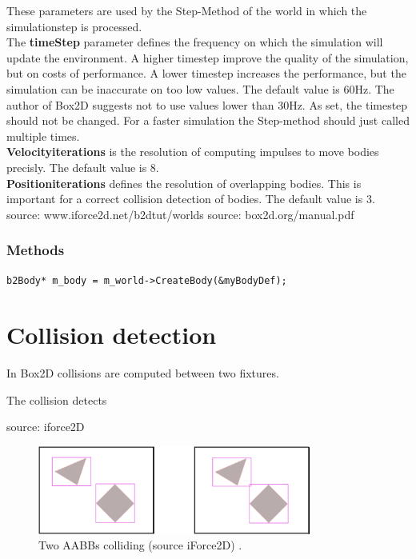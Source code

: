 \documentclass[10pt,a4paper,DIV=11]{scrreprt}
\begin{document}
These parameters are used by the Step-Method of the world in which the simulationstep is processed. \\

The \textbf{timeStep} parameter defines the frequency on which the simulation will update the environment. A higher timestep improve the quality of the simulation, but on costs of performance. A lower timestep increases the performance, but the simulation can be inaccurate on too low values.
The default value is 60Hz. The author of Box2D suggests not to use values lower than 30Hz. As set, the timestep should not be changed. For a faster simulation the Step-method should just called multiple times. \\


\textbf{Velocityiterations} is the resolution of computing impulses to move bodies precisly. The default value is 8. \\

\textbf{Positioniterations} defines the resolution of overlapping bodies. This is important for a correct collision detection of bodies. The default value is 3. \\


source: www.iforce2d.net/b2dtut/worlds
source: box2d.org/manual.pdf

\subsubsection*{Methods}
\begin{lstlisting}[caption={World creates a body},label=lst:world-body]
b2Body* m_body = m_world->CreateBody(&myBodyDef);
\end{lstlisting}

\section{Collision detection}
In Box2D collisions are computed between two fixtures.

The collision detects

source: iforce2D


\begin{center}
	\begin{figure}[H]
		\centering
		\includegraphics[width=0.8\textwidth,scale=1.0]{files/aabbs-crossing.png}  
		\caption{Two AABBs colliding (source iForce2D) \cite{box2d-iforce}.}
		\label{fig:aabbs}
	\end{figure}
\end{center}
\end{document}
